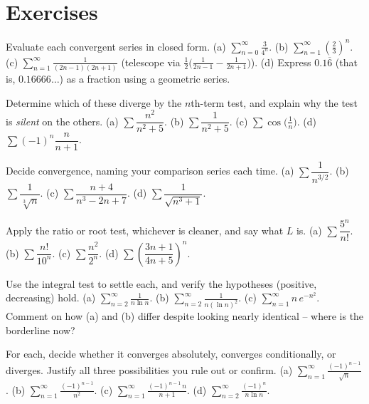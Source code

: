 \section{Exercises}
\label{ch29:exercises}

\begin{exercise}
Evaluate each convergent series in closed form.
(a) $\displaystyle\sum_{n=0}^\infty \frac{3}{4^n}$. \quad
(b) $\displaystyle\sum_{n=1}^\infty \left(\frac{2}{3}\right)^{n}$. \quad
(c) $\displaystyle\sum_{n=1}^\infty \frac{1}{(2n-1)(2n+1)}$ (telescope via $\tfrac12\big(\tfrac{1}{2n-1}-\tfrac{1}{2n+1}\big)$). \quad
(d) Express $0.1\overline{6}$ (that is, $0.16666\ldots$) as a fraction using a geometric series.
\end{exercise}

\begin{exercise}
Determine which of these diverge by the $n$th-term test, and explain why the test is \emph{silent} on the others.
(a) $\sum \dfrac{n^2}{n^2+5}$. \;
(b) $\sum \dfrac{1}{n^2+5}$. \;
(c) $\sum \cos\!\big(\tfrac1n\big)$. \;
(d) $\sum (-1)^n \dfrac{n}{n+1}$.
\end{exercise}

\begin{exercise}
Decide convergence, naming your comparison series each time.
(a) $\sum \dfrac{1}{n^{3/2}}$. \;
(b) $\sum \dfrac{1}{\sqrt[3]{n}}$. \;
(c) $\sum \dfrac{n+4}{n^3 - 2n + 7}$. \;
(d) $\sum \dfrac{1}{\sqrt{n^3+1}}$.
\end{exercise}

\begin{exercise}
Apply the ratio or root test, whichever is cleaner, and say what $L$ is.
(a) $\sum \dfrac{5^n}{n!}$. \;
(b) $\sum \dfrac{n!}{10^n}$. \;
(c) $\sum \dfrac{n^2}{2^n}$. \;
(d) $\sum \left(\dfrac{3n+1}{4n+5}\right)^{n}$.
\end{exercise}

\begin{exercise}
Use the integral test to settle each, and verify the hypotheses (positive, decreasing) hold.
(a) $\displaystyle\sum_{n=2}^\infty \frac{1}{n\ln n}$. \;
(b) $\displaystyle\sum_{n=2}^\infty \frac{1}{n(\ln n)^2}$. \;
(c) $\displaystyle\sum_{n=1}^\infty n\,e^{-n^2}$.
Comment on how (a) and (b) differ despite looking nearly identical -- where is the borderline now?
\end{exercise}

\begin{exercise}
For each, decide whether it converges absolutely, converges conditionally, or diverges. Justify all three possibilities you rule out or confirm.
(a) $\displaystyle\sum_{n=1}^\infty \frac{(-1)^{n-1}}{\sqrt n}$. \;
(b) $\displaystyle\sum_{n=1}^\infty \frac{(-1)^{n-1}}{n^2}$. \;
(c) $\displaystyle\sum_{n=1}^\infty \frac{(-1)^{n-1}\,n}{n+1}$. \;
(d) $\displaystyle\sum_{n=2}^\infty \frac{(-1)^n}{n\ln n}$.
\end{exercise}

